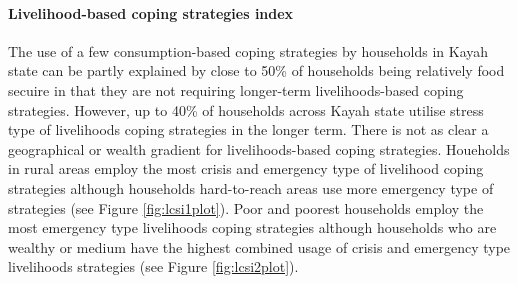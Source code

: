 \documentclass[12pt,a4paper]{article}
\let\oldparagraph\paragraph
\renewcommand{\paragraph}[1]{\oldparagraph{#1}\mbox{}}
\begin{document}
\hypertarget{lcsi-results}{%
\paragraph{Livelihood-based coping strategies index}\label{lcsi-results}}

The use of a few consumption-based coping strategies by households in Kayah state can be partly explained by close to 50\% of households being relatively food secuire in that they are not requiring longer-term livelihoods-based coping strategies. However, up to 40\% of households across Kayah state utilise stress type of livelihoods coping strategies in the longer term. There is not as clear a geographical or wealth gradient for livelihoods-based coping strategies. Houeholds in rural areas employ the most crisis and emergency type of livelihood coping strategies although households hard-to-reach areas use more emergency type of strategies (see Figure \ref{fig:lcsi1plot}). Poor and poorest households employ the most emergency type livelihoods coping strategies although households who are wealthy or medium have the highest combined usage of crisis and emergency type livelihoods strategies (see Figure \ref{fig:lcsi2plot}).
\end{document}
